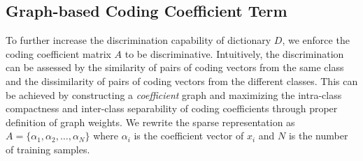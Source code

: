 \documentclass[journal]{IEEEtran}
\begin{document}
\subsection{Graph-based Coding Coefficient Term}
To further increase the discrimination capability of dictionary $D$, we enforce the coding coefficient matrix $A$ to be discriminative. Intuitively, the discrimination can be assessed by the similarity of pairs of coding vectors from the same class and the dissimilarity of pairs of coding vectors from the different classes. This can be achieved by constructing a \textit{coefficient} graph and maximizing the intra-class compactness and inter-class separability of coding coefficients through proper definition of graph weights. We rewrite the sparse representation as $A=\{ \alpha_1, \alpha_2, \dots , \alpha_N \}$ where $\alpha_i$ is the coefficient vector of $x_i$ and $N$ is the number of training samples. 
\end{document}
